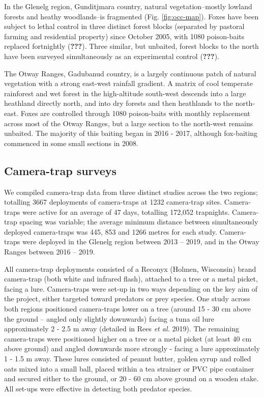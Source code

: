 \documentclass[11pt,a4paper,titlepage,twoside,openright]{style/unimelbthesis}
\begin{document}
\begin{mainmatter}
In the Glenelg region, Gunditjmara country, natural vegetation--mostly lowland forests and heathy woodlands--is fragmented (Fig. \ref{fig:occ-map}). Foxes have been subject to lethal control in three distinct forest blocks (separated by pastoral farming and residential property) since October 2005, with 1080 poison-baits replaced fortnightly ({\textbf{???}}). Three similar, but unbaited, forest blocks to the north have been surveyed simultaneously as an experimental control ({\textbf{???}}).

The Otway Ranges, Gadubanud country, is a largely continuous patch of natural vegetation with a strong east-west rainfall gradient. A matrix of cool temperate rainforest and wet forest in the high-altitude south-west descends into a large heathland directly north, and into dry forests and then heathlands to the north-east. Foxes are controlled through 1080 poison-baits with monthly replacement across most of the Otway Ranges, but a large section to the north-west remains unbaited. The majority of this baiting began in 2016 - 2017, although fox-baiting commenced in some small sections in 2008.

\hypertarget{camera-trap-surveys}{%
\subsection{Camera-trap surveys}\label{camera-trap-surveys}}

We compiled camera-trap data from three distinct studies across the two regions; totalling 3667 deployments of camera-traps at 1232 camera-trap sites. Camera-traps were active for an average of 47 days, totalling 172,052 trapnights. Camera-trap spacing was variable; the average minimum distance between simultaneously deployed camera-traps was 445, 853 and 1266 metres for each study. Camera-traps were deployed in the Glenelg region between 2013 -- 2019, and in the Otway Ranges between 2016 -- 2019.

All camera-trap deployments consisted of a Reconyx (Holmen, Wisconsin) brand camera-trap (both white and infrared flash), attached to a tree or a metal picket, facing a lure. Camera-traps were set-up in two ways depending on the key aim of the project, either targeted toward predators or prey species. One study across both regions positioned camera-traps lower on a tree (around 15 - 30 cm above the ground -- angled only slightly downwards) facing a tuna oil lure approximately 2 - 2.5 m away (detailed in Rees \emph{et al.} 2019). The remaining camera-traps were positioned higher on a tree or a metal picket (at least 40 cm above ground) and angled downwards more strongly - facing a lure approximately 1 - 1.5 m away. These lures consisted of peanut butter, golden syrup and rolled oats mixed into a small ball, placed within a tea strainer or PVC pipe container and secured either to the ground, or 20 - 60 cm above ground on a wooden stake. All set-ups were effective in detecting both predator species.


\end{mainmatter}
\end{document}
